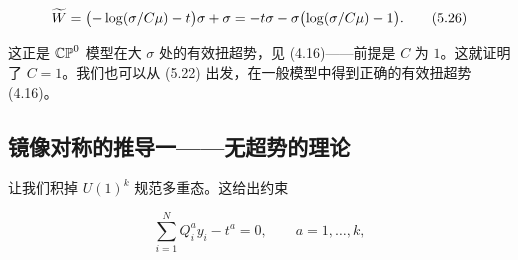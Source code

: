 \begin{equation}
    \widetilde{W}=\bigl(-\log(\sigma/C\mu)-t\bigr)\sigma+\sigma=-t\sigma-\sigma\bigl(\log(\sigma/C\mu)-1\bigr).
    \tag{5.26}
\end{equation}

这正是 $\mathbb{CP}^0$ 模型在大 $\sigma$ 处的有效扭超势，见 (4.16)——前提是 $C$ 为 $1$。这就证明了 $C=1$。我们也可以从 (5.22) 出发，在一般模型中得到正确的有效扭超势 (4.16)。


\subsection{镜像对称的推导一——无超势的理论}

让我们积掉 $U(1)^k$ 规范多重态。这给出约束

\begin{equation}
    \sum_{i=1}^{N}Q_i^a y_i-t^a=0,\qquad a=1,\dots,k,
    \tag{5.27}
\end{equation}
